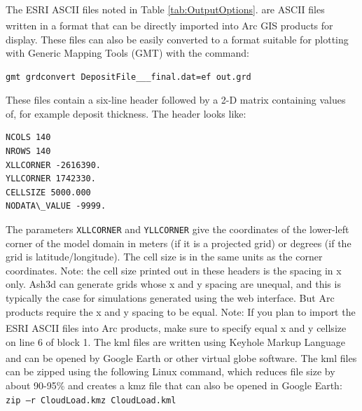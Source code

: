 \normalsize
The ESRI\textsuperscript{\tiny\textregistered} ASCII files noted in Table \ref{tab:OutputOptions}.
are ASCII files written in a format that
can be directly imported into Arc\textsuperscript{\tiny\textregistered}
GIS products for display.
These files can also be easily converted to a format suitable for plotting with
Generic Mapping Tools (GMT) with the command:
\begin{verbatim}
gmt grdconvert DepositFile___final.dat=ef out.grd
\end{verbatim}
These files contain a six-line
header followed by a 2-D matrix containing values of, for example deposit thickness.
The header looks like:
\small
\begin{verbatim}
NCOLS 140
NROWS 140
XLLCORNER -2616390.
YLLCORNER 1742330.
CELLSIZE 5000.000
NODATA\_VALUE -9999.
\end{verbatim}
\normalsize

The parameters \texttt{XLLCORNER} and \texttt{YLLCORNER} give the coordinates
of the lower-left
corner of the model domain in meters (if it is a projected grid) or degrees (if
the grid is latitude/longitude). The cell size is in the same units as the corner
coordinates. Note: the cell size printed out in these headers is the spacing in
x only. Ash3d can generate grids whose x and y spacing are unequal, and this is
typically the case for simulations generated using the web interface. But Arc
products require the x and y spacing to be equal. Note: If you plan to import
the ESRI\textsuperscript{\tiny\textregistered} ASCII files into
Arc products, make sure to specify equal x and y cellsize
on line 6 of block 1.
The kml files are written using Keyhole Markup Language and can be opened by
Google Earth\textsuperscript{\tiny\textregistered} or other virtual globe
software. The kml files can be zipped using the
following Linux command, which reduces file size by about 90-95\% and creates a
kmz file that can also be opened in Google Earth:
\texttt{zip –r CloudLoad.kmz CloudLoad.kml}

